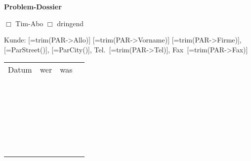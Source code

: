 \documentclass[a4paper,12pt]{article}
\begin{document}
\clearpage
{\Large \textbf{Problem-Dossier}}
\hfill\parbox{4cm}{
$\Box$ Tim-Abo\newline
$\Box$ dringend
}

Kunde: [=trim(PAR->Allo)] [=trim(PAR->Vorname)] [=trim(PAR->Firme)],
[=ParStreet()],
[=ParCity()],
Tel.~[=trim(PAR->Tel)],
Fax~[=trim(PAR->Fax)]

\vfill

\newcommand{\zeile}{
\vspace{13mm} & & & \\ \hline
}

\setlength{\extrarowheight}{2mm}

\begin{tabularx}{\textwidth}{|p{2cm}|p{2cm}|X|p{2cm}|}

\hline

Datum & wer & was & \\\

\hline

\zeile
\zeile
\zeile
\zeile
\zeile
\zeile
\zeile
\zeile
\zeile
\zeile
\zeile
\zeile
\zeile
\zeile
\zeile
\zeile
\zeile
\zeile
\zeile
\zeile
\zeile
\zeile
\zeile


\end{tabularx}
\end{document}
